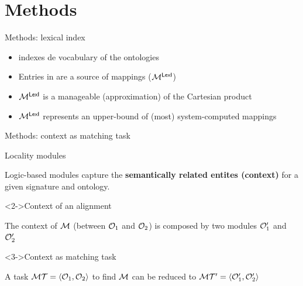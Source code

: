 \documentclass[t]{beamer}
\begin{document}
\section{Methods}





\begin{frame}{Methods: lexical index \lex}
	
	\begin{itemize}
	  \item \lex indexes de vocabulary of the ontologies
	  \item Entries in \lex are a source of mappings (\ie $\mathcal{M}^{\textsf{LexI}}$)
	  \item<2-> $\mathcal{M}^{\textsf{LexI}}$ is a manageable (approximation) of the Cartesian product
	  \item<2-> $\mathcal{M}^{\textsf{LexI}}$ represents an upper-bound of (most) system-computed
	  mappings
	\end{itemize}
	
	
	
	
	
	
\end{frame}




\begin{frame}{Methods: context as matching task}
	
	\begin{block}{Locality modules}
	
	Logic-based modules capture the \textbf{semantically related entites (context)}
	for a given signature and ontology.
	\end{block}
	
	\begin{block}<2->{Context of an alignment}
	
	The context of $\mathcal{M}$ (between $\mathcal{O}_1$ and $\mathcal{O}_2$) is composed by two modules
	$\mathcal{O}_1'$ and $\mathcal{O}_2'$
	
	
	\end{block}
	
	
	
	\begin{block}<3->{Context as matching task}
	
	
	A task $\mathcal{M}\mathcal{T}=\langle \mathcal{O}_1, \mathcal{O}_2 \rangle$ to find $\mathcal{M}$ can be reduced to
	$\mathcal{M}\mathcal{T}'=\langle \mathcal{O}_1', \mathcal{O}_2' \rangle$
	
	\end{block}
	
	
	
  	
\end{frame}
\end{document}
